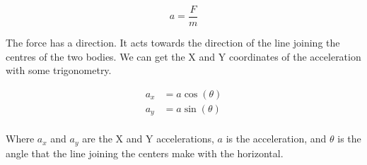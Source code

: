 \documentclass{article}
\begin{document}
\begin{displaymath}
    a = \frac{F}{m}
\end{displaymath}

The force has a direction. It acts towards the direction of the line joining
the centres of the two bodies. We can get the X and Y coordinates of the
acceleration with some trigonometry.

\begin{align*}
    a_x &= a \cos(\theta) \\
    a_y &= a \sin(\theta) \\
\end{align*}

Where \(a_x\) and \(a_y\) are the X and Y accelerations, \(a\) is the
acceleration, and \(\theta\) is the angle that the line joining the centers make
with the horizontal.
\end{document}
